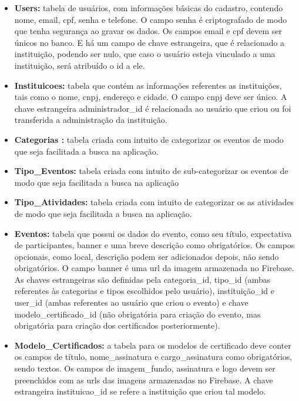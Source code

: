 \begin{itemize}
    \item \textbf{Users:} tabela de usuários, com informações básicas do cadastro, contendo nome, email, cpf, senha e telefone. O campo senha é criptografado de modo que tenha segurança ao gravar os dados. Os campos email e cpf devem ser únicos no banco. E há um campo de chave estrangeira, que é relacionado a instituição, podendo ser nulo, que caso o usuário esteja vinculado a uma instituição, será atribuído o id a ele.
    
    \item \textbf{Instituicoes:} tabela que contém as informações referentes as instituições, tais como o nome, cnpj, endereço e cidade. O campo cnpj deve ser único. A chave estrangeira administrador\_id é relacionada ao usuário que criou ou foi transferida a administração da instituição.
    
    \item \textbf{Categorias :} tabela criada com intuito de categorizar os eventos de modo que seja facilitada a busca na aplicação.
    
    \item \textbf{Tipo\_Eventos:} tabela criada com intuito de sub-categorizar os eventos de modo que seja facilitada a busca na aplicação
    
    \item \textbf{Tipo\_Atividades:} tabela criada com intuito de categorizar os as atividades de modo que seja facilitada a busca na aplicação.
    
    \item \textbf{Eventos:} tabela que possui os dados do evento, como seu título, expectativa de participantes, banner e uma breve descrição como obrigatórios. Os campos opcionais, como local, descrição podem ser adicionados depois, não sendo obrigatórios. O campo banner é uma url da imagem armazenada no Firebase. As chaves estrangeiras são definidas pela categoria\_id, tipo\_id (ambas referentes às categorias e tipos escolhidos pelo usuário), instituição\_id e user\_id (ambas referentes ao usuário que criou o evento) e chave modelo\_certificado\_id (não obrigatória para criação do evento, mas obrigatória para criação dos certificados posteriormente).
    
    \item \textbf{Modelo\_Certificados:} a tabela para os modelos de certificado deve conter os campos de título, nome\_assinatura e cargo\_assinatura como obrigatórios, sendo textos. Os campos de imagem\_fundo, assinatura e logo devem ser preenchidos com as urls das imagens armazenadas no Firebase. A chave estrangeira instituicao\_id se refere a instituição que criou tal modelo.
    

\end{itemize}
